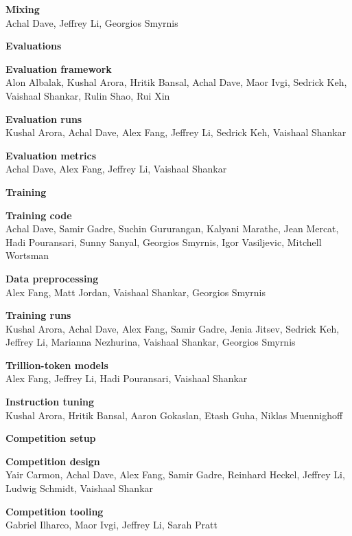 \documentclass{article}
\begin{document}
\textbf{Mixing}\\[0.25em]
Achal Dave, Jeffrey Li, Georgios Smyrnis

\begin{center}\large\textbf{Evaluations}\end{center}

\textbf{Evaluation framework}\\[0.25em]
Alon Albalak, Kushal Arora, Hritik Bansal, Achal Dave, Maor Ivgi, Sedrick Keh, Vaishaal Shankar, Rulin Shao, Rui Xin

\textbf{Evaluation runs}\\[0.25em]
Kushal Arora, Achal Dave, Alex Fang, Jeffrey Li, Sedrick Keh, Vaishaal Shankar

\textbf{Evaluation metrics}\\[0.25em]
Achal Dave, Alex Fang, Jeffrey Li, Vaishaal Shankar

\newpage
\begin{center}\large\textbf{Training}\end{center}

\textbf{Training code}\\[0.25em]
Achal Dave, Samir Gadre, Suchin Gururangan, Kalyani Marathe, Jean Mercat, Hadi Pouransari, Sunny Sanyal, Georgios Smyrnis, Igor Vasiljevic, Mitchell Wortsman

\textbf{Data preprocessing}\\[0.25em]
Alex Fang, Matt Jordan, Vaishaal Shankar, Georgios Smyrnis

\textbf{Training runs}\\[0.25em]
Kushal Arora, Achal Dave, Alex Fang, Samir Gadre, Jenia Jitsev, Sedrick Keh, Jeffrey Li, Marianna Nezhurina, Vaishaal Shankar, Georgios Smyrnis

\textbf{Trillion-token models}\\[0.25em]
Alex Fang, Jeffrey Li, Hadi Pouransari, Vaishaal Shankar

\textbf{Instruction tuning}\\[0.25em]
Kushal Arora, Hritik Bansal, Aaron Gokaslan, Etash Guha, Niklas Muennighoff

\begin{center}\large\textbf{Competition setup}\end{center}

\textbf{Competition design}\\[0.25em]
Yair Carmon, Achal Dave, Alex Fang, Samir Gadre, Reinhard Heckel, Jeffrey Li, Ludwig Schmidt, Vaishaal Shankar

\textbf{Competition tooling}\\[0.25em]
Gabriel Ilharco, Maor Ivgi, Jeffrey Li, Sarah Pratt
\end{document}

